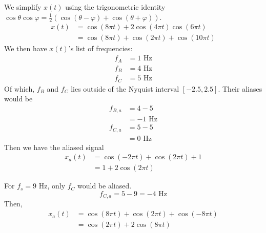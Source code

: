 \begin{itemize}
We simplify $x(t)$ using the trigonometric identity
$\cos\theta\cos\varphi = \frac{1}{2}(\cos(\theta-\varphi)+\cos(\theta+\varphi))$.
\begin{align*}
	x(t) &= \cos(8\pi t) + 2\cos(4\pi t)\cos(6\pi t) \\
		 &= \cos(8\pi t) + \cos(2\pi t) + \cos(10\pi t)
\end{align*}
We then have $x(t)$'s list of frequencies:
\begin{align*}
	f_A &= 1 \text{ Hz} \\
	f_B &= 4 \text{ Hz} \\
	f_C &= 5 \text{ Hz}
\end{align*}
Of which, $f_B$ and $f_C$ lies outside of the Nyquist interval
$[-2.5,2.5]$. Their aliases would be
\begin{align*}
	f_{B,a} &= 4 - 5 \\
			&= -1 \text{ Hz} \\
	f_{C,a} &= 5 - 5 \\
			&= 0 \text{ Hz}
\end{align*}
Then we have the aliased signal
\begin{align*}
	x_a(t) &= \cos(-2\pi t) + \cos(2\pi t) + 1 \\
		   &= 1 + 2\cos(2\pi t)
\end{align*}

For $f_s = 9$ Hz, only $f_C$ would be aliased.
\begin{equation*}
	f_{C,a} = 5 - 9 = -4 \text{ Hz}
\end{equation*}
Then,
\begin{align*}
	x_a(t) &= \cos(8\pi t) + \cos(2\pi t) + \cos(-8\pi t) \\
		   &= \cos(2\pi t) + 2\cos(8\pi t)
\end{align*}

\end{itemize}
